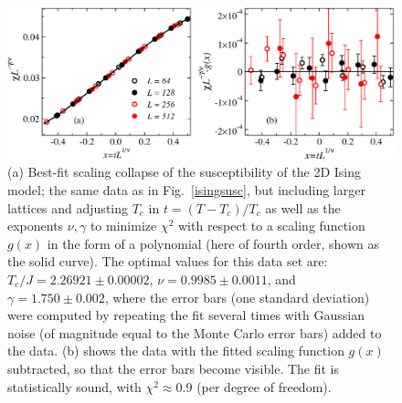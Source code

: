 \documentclass[draft,numberedheadings]{aipproc}
\begin{document}
\begin{figure}
\includegraphics[width=12.5cm, clip]{xscalefit.eps}
\caption{(a) Best-fit scaling collapse of the susceptibility of the 2D Ising model; the same data as in Fig.~\ref{isingsusc}, but including larger lattices 
and adjusting $T_c$ in $t=(T-T_c)/T_c$ as well as the exponents $\nu,\gamma$ to minimize $\chi^2$ with respect to a scaling function $g(x)$ in the form of a
polynomial (here of fourth order, shown as the solid curve). The optimal values for this data set are: $T_c/J=2.26921 \pm 0.00002$, $\nu=0.9985\pm 0.0011$, 
and $\gamma=1.750\pm 0.002$, where the error bars (one standard deviation) were computed by repeating the fit several times with Gaussian noise (of magnitude
equal to the Monte Carlo error bars) added to the data. (b) shows the data with the fitted scaling function $g(x)$ subtracted, so that the 
error bars become visible. The fit is statistically sound, with $\chi^2 \approx 0.9$ (per degree of freedom).}
\label{xscalefit}
\end{figure}
\end{document}
